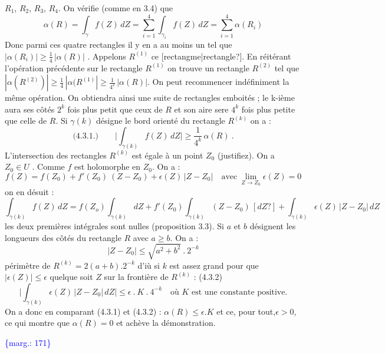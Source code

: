 \documentclass[11pt]{article}
\newcommand{\scanpage}[1]{\par\bigskip\noindent{\small\sffamily[scan #1]}\par}
\newcommand{\mspage}[1]{{\small\sffamily[p.\,#1]}}
\newcommand{\hand}[1]{\textcolor{blue}{#1}}
\newcommand{\margin}[1]{\textcolor{blue}{\{\textsf{marg.:} #1\}}}
\newcommand{\unsure}[1]{[#1?]}
\begin{document}
\mspage{\hand{170}}

\clearpage
\scanpage{119/171}
\mspage{- 10 -}

$R_1$, $R_2$, $R_3$, $R_4$. On vérifie (comme en 3.4) que
\[ \alpha(R) = \int_\gamma f(Z)\, dZ = \sum_{i=1}^{4} \int_{\gamma_i} f(Z)\, dZ = \sum_{i=1}^{4} \alpha(R_i) \]
Donc parmi ces quatre rectangles il y en a au moins un tel que
$|\alpha(R_i)| \geq \frac{1}{4}\, |\alpha(R)|$ . Appelons $R^{(1)}$ ce \unsure{rectangme|rectangle}.
En réitérant l'opération précédente sur le rectangle $R^{(1)}$ on trouve un
rectangle $R^{(2)}$ tel que $|\alpha(R^{(2)})| \geq \frac{1}{4}\, |\alpha(R^{(1)}| \geq \frac{1}{4^2}\, |\alpha(R)|$.
On peut recommencer indéfiniment la même opération. On obtiendra ainsi une suite
de rectangles emboités ; le k-ième aura ses côtés $2^k$ fois plus petit que ceux
de $R$ et son aire sere $4^k$ fois plus petite que celle de $R$.
Si $\gamma(k)$ désigne le bord orienté du rectangle $R^{(k)}$ on a :
\[ \text{(4.3.1.)} \qquad \Big|\int_{\gamma(k)} f(Z)\, dZ\Big| \geq \frac{1}{4^k}\, \alpha(R) \ . \]
L'intersection des rectangles $R^{(k)}$ est égale à un point $Z_0$
(justifiez). On a $Z_0 \in U$ . Comme $f$ est holomorphe en $Z_0$. On a :
\[ f(Z) = f(Z_0) + f'(Z_0)\ (Z-Z_0) + \epsilon(Z)\, |Z-Z_0| \quad \text{avec} \ \lim_{Z \to Z_0} \epsilon(Z) = 0 \]
on en désuit :
\[ \int_{\gamma(k)} f(Z)\, dZ = f(Z_o) \int_{\gamma(k)} dZ + f'(Z_0) \int_{\gamma(k)} (Z-Z_0)\, \unsure{dZ} + \int_{\gamma(k)} \epsilon(Z)\, |Z-Z_0|\, dZ \]
les deux premières intégrales sont nulles (proposition 3.3). Si $a$ et $b$ désignent
les longueurs des côtés du rectangle $R$ avec $a \geq b$. On a :
\[ |Z-Z_0| \leq \sqrt{a^2+b^2}\ .\ 2^{-k} \]
périmètre de $R^{(k)} = 2(a+b).2^{-k}$ d'iù si $k$ est assez grand pour que $|\epsilon(Z)| \leq \epsilon$
quelque soit $Z$ sur la frontière de $R^{(k)}$ :
(4.3.2)
\[ \Big|\int_{\gamma(k)} \epsilon(Z)\, |Z-Z_0|\, dZ\Big| \leq \epsilon\ .\ K\ .\ 4^{-k} \quad \text{où $K$ est une constante positive.} \]
On a donc en comparant (4.3.1) et (4.3.2) :
$\alpha(R) \leq \epsilon.K$ et ce, pour tout,$\epsilon > 0$, ce qui montre que $\alpha(R) = 0$ et
achève la démonstration.

\margin{171}
\end{document}
